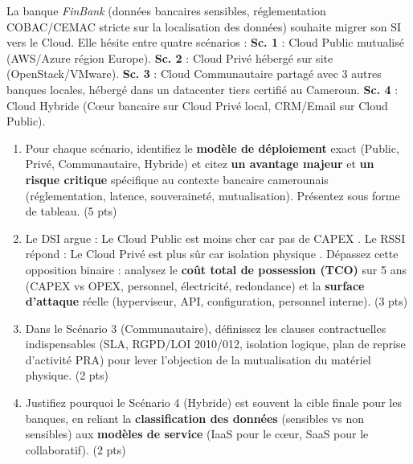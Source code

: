 \documentclass[11pt]{article}
\begin{document}
\begin{exercice}
La banque \textit{FinBank} (données bancaires sensibles, réglementation COBAC/CEMAC stricte sur la localisation des données) souhaite migrer son SI vers le Cloud. Elle hésite entre quatre scénarios : 
\textbf{Sc. 1} : Cloud Public mutualisé (AWS/Azure région Europe). 
\textbf{Sc. 2} : Cloud Privé hébergé sur site (OpenStack/VMware). 
\textbf{Sc. 3} : Cloud Communautaire partagé avec 3 autres banques locales, hébergé dans un datacenter tiers certifié au Cameroun. 
\textbf{Sc. 4} : Cloud Hybride (Cœur bancaire sur Cloud Privé local, CRM/Email sur Cloud Public).
\begin{enumerate}
    \item Pour chaque scénario, identifiez le \textbf{modèle de déploiement} exact (Public, Privé, Communautaire, Hybride) et citez \textbf{un avantage majeur} et \textbf{un risque critique} spécifique au contexte bancaire camerounais (réglementation, latence, souveraineté, mutualisation). Présentez sous forme de tableau. (5 pts)
    \item Le DSI argue : \og{} Le Cloud Public est moins cher car pas de CAPEX \fg{}. Le RSSI répond : \og{} Le Cloud Privé est plus sûr car isolation physique \fg{}. Dépassez cette opposition binaire : analysez le \textbf{coût total de possession (TCO)} sur 5 ans (CAPEX vs OPEX, personnel, électricité, redondance) et la \textbf{surface d'attaque} réelle (hyperviseur, API, configuration, personnel interne). (3 pts)
    \item Dans le Scénario 3 (Communautaire), définissez les clauses contractuelles indispensables (SLA, RGPD/LOI 2010/012, isolation logique, plan de reprise d'activité PRA) pour lever l'objection de la mutualisation du matériel physique. (2 pts)
    \item Justifiez pourquoi le Scénario 4 (Hybride) est souvent la cible finale pour les banques, en reliant la \textbf{classification des données} (sensibles vs non sensibles) aux \textbf{modèles de service} (IaaS pour le cœur, SaaS pour le collaboratif). (2 pts)
\end{enumerate}
\end{exercice}
\end{document}
